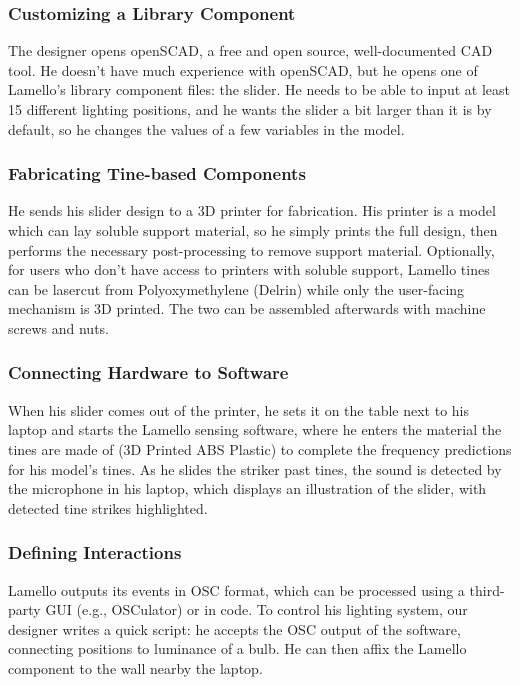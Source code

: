      \subsubsection{Customizing a Library Component}
    The designer opens openSCAD, a free and open source, well-documented CAD tool. He doesn't have much experience with openSCAD, but he opens one of Lamello's library component files: the slider. He needs to be able to input at least 15 different lighting positions, and he wants the slider a bit larger than it is by default, so he changes the values of a few variables in the model. 
    
     \subsubsection{Fabricating Tine-based Components}
    He sends his slider design to a 3D printer for fabrication. His printer is a model which can lay soluble support material, so he simply prints the full design, then performs the necessary post-processing to remove support material. Optionally, for users who don't have access to printers with soluble support, Lamello tines can be lasercut from Polyoxymethylene (Delrin) while only the user-facing mechanism is 3D printed. The two can be assembled afterwards with machine screws and nuts.
    
    \subsubsection{Connecting Hardware to Software}
    
    When his slider comes out of the printer, he sets it on the table next to his laptop and starts the Lamello sensing software, where he enters the material the tines are made of (3D Printed ABS Plastic) to complete the frequency predictions for his model's tines. As he slides the striker past tines, the sound is detected by the microphone in his laptop, which displays an illustration of the slider, with detected tine strikes highlighted.
    
    \subsubsection{Defining Interactions}
    
    Lamello outputs its events in OSC format, which can be processed using a third-party GUI (e.g., OSCulator) or in code. To control his lighting system, our designer writes a quick script: he accepts the OSC output of the software, connecting positions to luminance of a bulb. He can then affix the Lamello component to the wall nearby the laptop.
    
